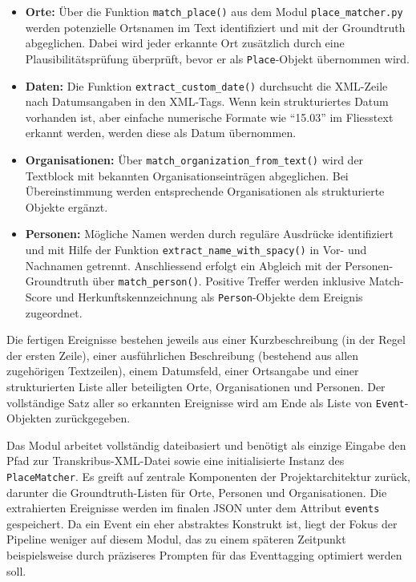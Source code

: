 \documentclass[12pt, a4paper, ngerman, bidi=default]{article}
\begin{document}
\begin{itemize}
  \item \textbf{Orte:} Über die Funktion \texttt{match\_place()} aus dem Modul \texttt{place\_matcher.py} werden potenzielle Ortsnamen im Text identifiziert und mit der Groundtruth abgeglichen. Dabei wird jeder erkannte Ort zusätzlich durch eine Plausibilitätsprüfung überprüft, bevor er als \texttt{Place}-Objekt übernommen wird.
  \item \textbf{Daten:} Die Funktion \texttt{extract\_custom\_date()} durchsucht die XML-Zeile nach Datumsangaben in den XML-Tags. Wenn kein strukturiertes Datum vorhanden ist, aber einfache numerische Formate wie \enquote{15.03} im Fliesstext erkannt werden, werden diese als Datum übernommen.
  \item \textbf{Organisationen:} Über \texttt{match\_organization\_from\_text()} wird der Textblock mit bekannten Organisationseinträgen abgeglichen. Bei Übereinstimmung werden entsprechende Organisationen als strukturierte Objekte ergänzt.
  \item \textbf{Personen:} Mögliche Namen werden durch reguläre Ausdrücke identifiziert und mit Hilfe der Funktion \texttt{extract\_name\_with\_spacy()} in Vor- und Nachnamen getrennt. Anschliessend erfolgt ein Abgleich mit der Personen-Groundtruth über \texttt{match\_person()}. Positive Treffer werden inklusive Match-Score und Herkunftskennzeichnung als \texttt{Person}-Objekte dem Ereignis zugeordnet.
\end{itemize}

Die fertigen Ereignisse bestehen jeweils aus einer Kurzbeschreibung (in der Regel der ersten Zeile), 
einer ausführlichen Beschreibung (bestehend aus allen zugehörigen Textzeilen), einem Datumsfeld, einer 
Ortsangabe und einer strukturierten Liste aller beteiligten Orte, Organisationen und Personen. Der vollständige 
Satz aller so erkannten Ereignisse wird am Ende als Liste von \texttt{Event}-Objekten zurückgegeben.

Das Modul arbeitet vollständig dateibasiert und benötigt als einzige Eingabe den Pfad zur Transkribus-XML-Datei 
sowie eine initialisierte Instanz des \texttt{PlaceMatcher}. Es greift auf zentrale Komponenten der Projektarchitektur 
zurück, darunter die Groundtruth-Listen für Orte, Personen und Organisationen. Die extrahierten Ereignisse werden 
im finalen JSON unter dem Attribut \texttt{events} gespeichert. Da ein Event ein eher abstraktes Konstrukt ist, liegt der
Fokus der Pipeline weniger auf diesem Modul, das zu einem späteren Zeitpunkt beispielsweise durch präziseres Prompten für das
Eventtagging optimiert werden soll. 
\end{document}
